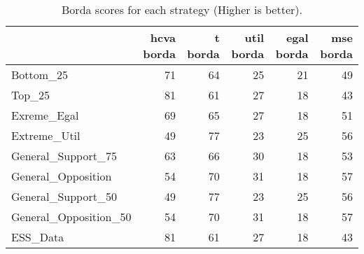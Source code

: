 \begin{table}
\caption{Borda scores for each strategy (Higher is better).}
\begin{tabular}{lrrrrr}
\toprule
 & hcva borda & t borda & util borda & egal borda & mse borda \\
\midrule
Bottom_25 & 71 & 64 & 25 & 21 & 49 \\
Top_25 & 81 & 61 & 27 & 18 & 43 \\
Exreme_Egal & 69 & 65 & 27 & 18 & 51 \\
Extreme_Util & 49 & 77 & 23 & 25 & 56 \\
General_Support_75 & 63 & 66 & 30 & 18 & 53 \\
General_Opposition & 54 & 70 & 31 & 18 & 57 \\
General_Support_50 & 49 & 77 & 23 & 25 & 56 \\
General_Opposition_50 & 54 & 70 & 31 & 18 & 57 \\
ESS_Data & 81 & 61 & 27 & 18 & 43 \\
\bottomrule
\end{tabular}
\end{table}
